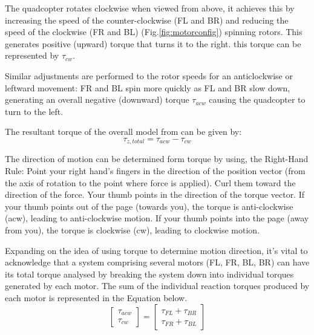 \documentclass{report}
\begin{document}
The quadcopter rotates clockwise when viewed from above, it achieves this by
increasing the speed of the counter-clockwise (FL and BR) and reducing the speed
of the clockwise (FR and BL) (Fig.\ref{fig:motorconfig}) spinning rotors. This
generates positive (upward) torque that turns it to the right. this torque can
be represented by \(\tau_{cw}\).

Similar adjustments are performed to the rotor speeds for an anticlockwise or
leftward movement: FR and BL spin more quickly as FL and BR slow down,
generating an overall negative (downward) torque \(\tau_{acw}\) causing the
quadcopter to turn to the left.

The resultant torque of the overall model from can be given by:
\begin{equation}
  \tau_{z, total} = \tau_{acw} - \tau_{cw}
  \label{total_torque}
\end{equation}

The direction of motion can be determined form torque by using, the Right-Hand
Rule: Point your right hand's fingers in the direction of the position vector
(from the axis of rotation to the point where force is applied). Curl them
toward the direction of the force. Your thumb points in the direction of the
torque vector. If your thumb points out of the page (towards you), the torque is
anti-clockwise (acw), leading to anti-clockwise motion. If your thumb points
into the page (away from you), the torque is clockwise (cw), leading to
clockwise motion.

Expanding on the idea of using torque to determine motion direction, it's vital
to acknowledge that a system comprising several motors (FL, FR, BL, BR)  can
have its total torque analysed by breaking the system down into individual
torques generated by each motor. The sum of the individual reaction torques
produced by each motor is represented in the Equation below. 
\begin{equation}
  \begin{bmatrix}
    \tau_{acw}\\
    \tau_{cw}
  \end{bmatrix} = 
  \begin{bmatrix}
    \tau_{FL} + \tau_{BR}\\
    \tau_{FR} + \tau_{BL}
  \end{bmatrix}
\end{equation}
\end{document}

